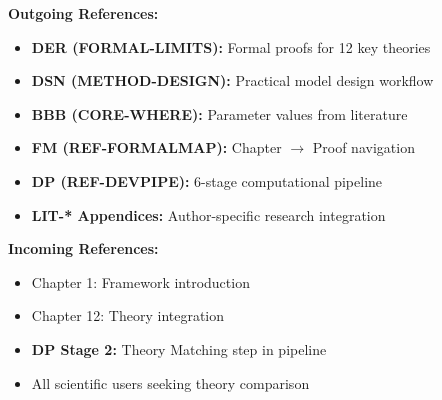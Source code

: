 \begin{tcolorbox}[colback=gray!5!white, colframe=gray!75!black,
    title=\textbf{Cross-Reference Map}]

\textbf{Outgoing References:}
\begin{itemize}[nosep]
    \item \textbf{DER (FORMAL-LIMITS):} Formal proofs for 12 key theories
    \item \textbf{DSN (METHOD-DESIGN):} Practical model design workflow
    \item \textbf{BBB (CORE-WHERE):} Parameter values from literature
    \item \textbf{FM (REF-FORMALMAP):} Chapter $\rightarrow$ Proof navigation
    \item \textbf{DP (REF-DEVPIPE):} 6-stage computational pipeline
    \item \textbf{LIT-* Appendices:} Author-specific research integration
\end{itemize}

\textbf{Incoming References:}
\begin{itemize}[nosep]
    \item Chapter 1: Framework introduction
    \item Chapter 12: Theory integration
    \item \textbf{DP Stage 2:} Theory Matching step in pipeline
    \item All scientific users seeking theory comparison
\end{itemize}

\end{tcolorbox}

